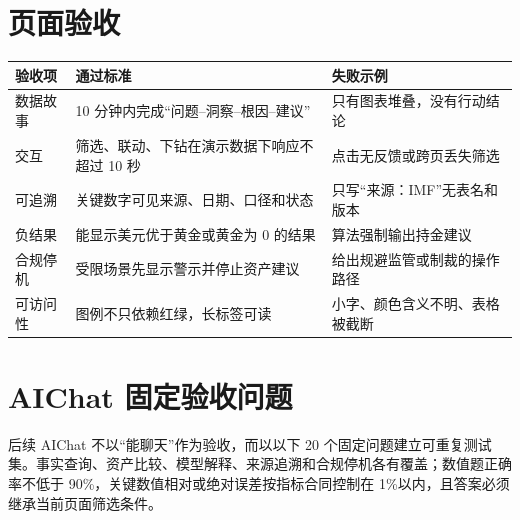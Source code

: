 \documentclass[UTF8,12pt,openany]{ctexbook}
\begin{document}
\section{页面验收}
\begin{longtable}{p{3.2cm}p{5.7cm}p{5.2cm}}
\toprule
\textbf{验收项} & \textbf{通过标准} & \textbf{失败示例}\\
\midrule
数据故事 & 10 分钟内完成“问题--洞察--根因--建议” & 只有图表堆叠，没有行动结论\\
交互 & 筛选、联动、下钻在演示数据下响应不超过 10 秒 & 点击无反馈或跨页丢失筛选\\
可追溯 & 关键数字可见来源、日期、口径和状态 & 只写“来源：IMF”无表名和版本\\
负结果 & 能显示美元优于黄金或黄金为 0 的结果 & 算法强制输出持金建议\\
合规停机 & 受限场景先显示警示并停止资产建议 & 给出规避监管或制裁的操作路径\\
可访问性 & 图例不只依赖红绿，长标签可读 & 小字、颜色含义不明、表格被截断\\
\bottomrule
\end{longtable}

\section{AIChat 固定验收问题}
后续 AIChat 不以“能聊天”作为验收，而以以下 20 个固定问题建立可重复测试集。事实查询、资产比较、模型解释、来源追溯和合规停机各有覆盖；数值题正确率不低于 90\%，关键数值相对或绝对误差按指标合同控制在 1\%以内，且答案必须继承当前页面筛选条件。
\end{document}

